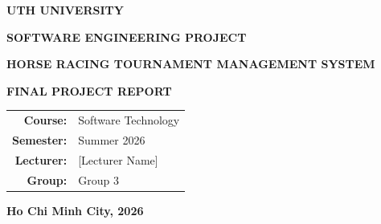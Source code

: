 \begin{titlepage}
	
	\begin{center}
		
		\textbf{\Large UTH UNIVERSITY}
		
		\vspace{1cm}
		
		\textbf{\Large SOFTWARE ENGINEERING PROJECT}
		
		\vspace{2cm}
		
		\textbf{\Huge HORSE RACING TOURNAMENT MANAGEMENT SYSTEM}
		
		\vspace{1cm}
		
		\textbf{\Large FINAL PROJECT REPORT}
		
		\vspace{1.8cm}
		
		\begin{tabular}{rl}
			\textbf{Course:} & Software Technology \\
			\textbf{Semester:} & Summer 2026 \\
			\textbf{Lecturer:} & [Lecturer Name] \\
			\textbf{Group:} & Group 3 \\
			
		\end{tabular}
		
		\vfill
		
		\textbf{Ho Chi Minh City, 2026}
		
	\end{center}
	
\end{titlepage}